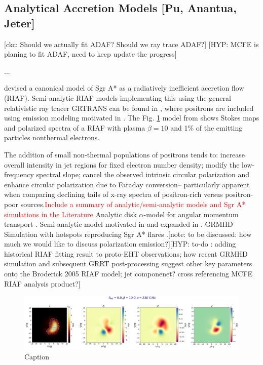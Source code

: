\documentclass[twocolumn,tighten,dvipsnames,linenumbers]{aastex63}
\newcommand\note[1]{{\color{OliveGreen}[note: #1]}}
\newcommand\ckc[1]{{\color{MidnightBlue}[ckc: #1]}}
\newcommand\hyp[1]{{\color{Salmon}[HYP: #1]}}
\begin{document}
\subsection{Analytical Accretion Models
  [Pu, Anantua, Jeter]}
\label{sec:anamodels}

\ckc{Should we actually fit ADAF?
  Should we ray trace ADAF?}
\hyp{MCFE is planing to fit ADAF, need to keep update the progress}

...

\cite{Broderick2005} devised a canonical model of Sgr A* as a  radiatively inefficient accretion flow (RIAF). Semi-analytic RIAF models implementing  this using the general relativistic ray tracer GRTRANS \citep{2016MNRAS.462..115D} can be found in  \cite{Emami2021}, where  positrons are included using emission modeling motivated in  \cite{Anantua:2019bna}. The Fig. \ref{fig:EmamiRIAF} model from \cite{Emami2021}  shows Stokes maps and polarized spectra of a \cite{Broderick2005} RIAF with plasma $\beta=10$ and 1$\%$ of the emitting particles nonthermal electrons.


The addition of small non-thermal populations of positrons \cite{Emami2021} tends to: increase overall intensity in jet regions for fixed electron number density; modify the low-frequency spectral slope; cancel the observed intrinsic circular polarization and enhance circular polarization due to Faraday conversion-- particularly apparent when comparing declining tails of x-ray spectra of positron-rich versus positron-poor sources.\textcolor{red}{Include a summary of analytic/semi-analytic models and Sgr A* simulations in the Literature} Analytic disk $\alpha$-model for angular momentum transport \cite{Shakura1973}. Semi-analytic model motivated in \cite{Yuan2003} and expanded in \cite{Broderick2011}. GRMHD Simulation with hotspots reproducing Sgr A* flares \cite{Ripperda2020}.\note{to be discussed: how much we would like to discuss polarization emission?}\hyp{to-do :  adding historical RIAF fitting result to proto-EHT observations; how recent  GRMHD simulation and subsequent GRRT post-processing suggest other key parameters onto the Broderick 2005 RIAF model; jet componenet? cross referencing MCFE RIAF analysis product?}


\begin{figure}[H]
  \includegraphics[width=.55\textwidth,height=25mm%
]{RIAFSgrAPlaneTscl1Pt5e11beta1Pt0e01fpos0Pt0fNTH1Pt0e-02copy}
  \caption{Caption}
  \label{fig:EmamiRIAF}
\end{figure}
\end{document}

